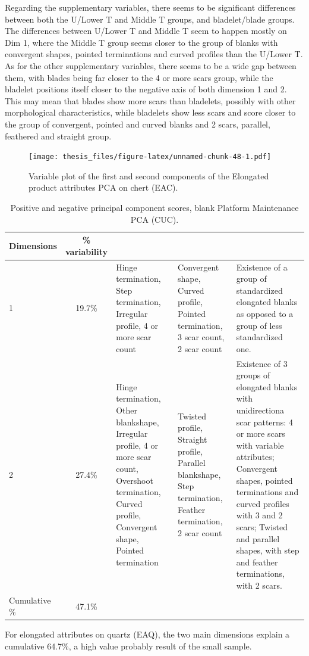 \documentclass[12pt,twoside]{reedthesis}
\begin{document}
Regarding the supplementary variables, there seems to be significant differences between both the U/Lower T and Middle T groups, and bladelet/blade groups. The differences between U/Lower T and Middle T seem to happen mostly on Dim 1, where the Middle T group seems closer to the group of blanks with convergent shapes, pointed terminations and curved profiles than the U/Lower T. As for the other supplementary variables, there seems to be a wide gap between them, with blades being far closer to the 4 or more scars group, while the bladelet positions itself closer to the negative axis of both dimension 1 and 2. This may mean that blades show more scars than bladelets, possibly with other morphological characteristics, while bladelets show less scars and score closer to the group of convergent, pointed and curved blanks and 2 scars, parallel, feathered and straight group.
\begin{figure}
\centering
\texttt{[image: thesis\_files/figure-latex/unnamed-chunk-48-1.pdf]}
\caption{\label{fig:unnamed-chunk-48}Variable plot of the first and second components of the Elongated product attributes PCA on chert (EAC).}
\end{figure}
\begin{table}

\caption{\label{tab:unnamed-chunk-49}Positive and negative principal component scores, blank Platform Maintenance PCA (CUC).}
\centering
\begin{tabular}[t]{lc>{\raggedright\arraybackslash}p{3cm}>{\raggedright\arraybackslash}p{3cm}>{\raggedright\arraybackslash}p{3cm}}
\toprule
\multicolumn{1}{c}{\textbf{Dimensions}} & \multicolumn{1}{c}{\textbf{\% variability}} & \multicolumn{1}{>{\centering\arraybackslash}p{3cm}}{\textbf{+}} & \multicolumn{1}{>{\centering\arraybackslash}p{3cm}}{\textbf{-}} & \multicolumn{1}{>{\centering\arraybackslash}p{3cm}}{\textbf{Interpretation}}\\
\midrule
1 & 19.7\% & Hinge termination, Step termination, Irregular profile, 4 or more scar count & Convergent shape, Curved profile, Pointed termination, 3 scar count, 2 scar count & Existence of a group of standardized elongated blanks as opposed to a group of less standardized one.\\
2 & 27.4\% & Hinge termination, Other blankshape, Irregular profile, 4 or more scar count, Overshoot termination, Curved profile, Convergent shape, Pointed termination & Twisted profile, Straight profile, Parallel blankshape, Step termination, Feather termination, 2 scar count & Existence of 3 groups of elongated blanks with unidirectiona scar patterns: 4 or more scars with variable attributes; Convergent shapes, pointed terminations and curved profiles with 3 and 2 scars; Twisted and parallel shapes, with step and feather terminations, with 2 scars.\\
Cumulative \% & 47.1\% &  &  & \\
\bottomrule
\end{tabular}
\end{table}
For elongated attributes on quartz (EAQ), the two main dimensions explain a cumulative 64.7\%, a high value probably result of the small sample.
\end{document}
